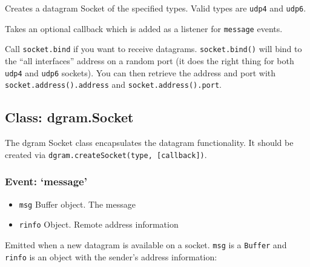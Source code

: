 Creates a datagram Socket of the specified types. Valid types are
\texttt{udp4} and \texttt{udp6}.

Takes an optional callback which is added as a listener for
\texttt{message} events.

Call \texttt{socket.bind} if you want to receive datagrams.
\texttt{socket.bind()} will bind to the ``all interfaces'' address on a
random port (it does the right thing for both \texttt{udp4} and
\texttt{udp6} sockets). You can then retrieve the address and port with
\texttt{socket.address().address} and \texttt{socket.address().port}.

\subsection{Class: dgram.Socket}

The dgram Socket class encapsulates the datagram functionality. It
should be created via \texttt{dgram.createSocket(type, {[}callback{]})}.

\subsubsection{Event: `message'}

\begin{itemize}
\item
  \texttt{msg} Buffer object. The message
\item
  \texttt{rinfo} Object. Remote address information
\end{itemize}

Emitted when a new datagram is available on a socket. \texttt{msg} is a
\texttt{Buffer} and \texttt{rinfo} is an object with the sender's
address information:

\begin{Shaded}
\end{Shaded}

